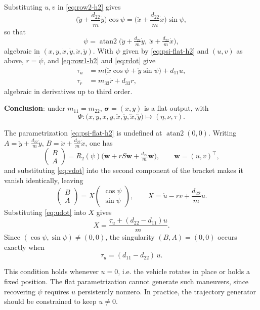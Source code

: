 Substituting $u,v$ in \eqref{eq:row2-h2} gives
\begin{equation}
\Big(\ddot y+\frac{d_{22}}{m}\dot y\Big)\cos\psi=\Big(\ddot x+\frac{d_{22}}{m}\dot x\Big)\sin\psi,
\end{equation}
so that
\begin{equation}
\psi=\operatorname{atan2}\!\Big(\ddot y+\tfrac{d_{22}}{m}\dot y,\ \ddot x+\tfrac{d_{22}}{m}\dot x\Big),
\label{eq:psi-flat-h2}
\end{equation}
algebraic in $(x,y,\dot x,\dot y,\ddot x,\ddot y)$. With $\psi$ given by \eqref{eq:psi-flat-h2} and $(u,v)$ as above, $r=\dot\psi$, and \eqref{eq:row1-h2} and \eqref{eq:rdot} give
\begin{align}
\tau_u &= m\big(\ddot x\cos\psi+\ddot y\sin\psi\big)+d_{11}u,\\
\tau_r &= m_{33}\dot r+d_{33}r,
\end{align}
algebraic in derivatives up to third order.

\textbf{Conclusion}: under $m_{11}=m_{22}$, $\bm\sigma=(x,y)$ is a flat output, with
\begin{equation}
\Phi:\big(x,y,\dot x,\dot y,\ddot x,\ddot y,\dddot x,\dddot y\big)\longmapsto(\eta,\nu,\tau).
\end{equation}

\begin{remark}
The parametrization \eqref{eq:psi-flat-h2} is undefined at $\operatorname{atan2}(0,0)$. Writing $A=\ddot y+\tfrac{d_{22}}{m}\dot y$, $B=\ddot x+\tfrac{d_{22}}{m}\dot x$, one has
\begin{equation}
\begin{pmatrix}B\\A\end{pmatrix}=R_2(\psi)\Big(\dot{\bm w}+rS\bm w+\tfrac{d_{22}}{m}\bm w\Big),\qquad \bm w=(u,v)^\top,
\end{equation}
and substituting \eqref{eq:vdot} into the second component of the bracket makes it vanish identically, leaving
\begin{equation}
\begin{pmatrix}B\\A\end{pmatrix}=X\begin{pmatrix}\cos\psi\\\sin\psi\end{pmatrix},\qquad X=\dot u-rv+\frac{d_{22}}{m}u.
\end{equation}
Substituting \eqref{eq:udot} into $X$ gives
\begin{equation}
X=\frac{\tau_u+(d_{22}-d_{11})u}{m}.
\end{equation}
Since $(\cos\psi,\sin\psi)\neq(0,0)$, the singularity $(B,A)=(0,0)$ occurs exactly when
\begin{equation}
\tau_u=(d_{11}-d_{22})\,u.
\end{equation}

This condition holds whenever $u=0$, i.e. the vehicle rotates in place or holds a fixed position. The flat parametrization cannot generate such maneuvers, since recovering $\psi$ requires $u$ persistently nonzero. In practice, the trajectory generator should be constrained to keep $u\neq0$.

\end{remark}

